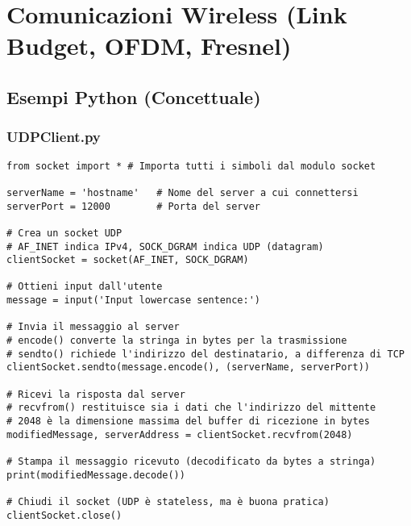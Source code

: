 \section{Comunicazioni Wireless (Link Budget, OFDM, Fresnel)}
\label{sec:wireless}

\subsection{Esempi Python (Concettuale)}
\subsubsection{UDPClient.py}
\begin{verbatim}
from socket import * # Importa tutti i simboli dal modulo socket

serverName = 'hostname'   # Nome del server a cui connettersi
serverPort = 12000        # Porta del server

# Crea un socket UDP
# AF_INET indica IPv4, SOCK_DGRAM indica UDP (datagram)
clientSocket = socket(AF_INET, SOCK_DGRAM)

# Ottieni input dall'utente
message = input('Input lowercase sentence:')

# Invia il messaggio al server
# encode() converte la stringa in bytes per la trasmissione
# sendto() richiede l'indirizzo del destinatario, a differenza di TCP
clientSocket.sendto(message.encode(), (serverName, serverPort))

# Ricevi la risposta dal server
# recvfrom() restituisce sia i dati che l'indirizzo del mittente
# 2048 è la dimensione massima del buffer di ricezione in bytes
modifiedMessage, serverAddress = clientSocket.recvfrom(2048)

# Stampa il messaggio ricevuto (decodificato da bytes a stringa)
print(modifiedMessage.decode())

# Chiudi il socket (UDP è stateless, ma è buona pratica)
clientSocket.close()
\end{verbatim}

